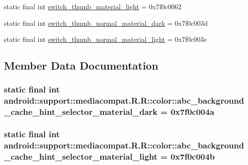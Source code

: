 \begin{CompactItemize}
\item 
static final int \hyperlink{classandroid_1_1support_1_1mediacompat_1_1_r_1_1color_449eb02491887275147f6712844598fb}{switch\_\-thumb\_\-material\_\-light} = 0x7f0c0062
\item 
static final int \hyperlink{classandroid_1_1support_1_1mediacompat_1_1_r_1_1color_df250ab8a51b8f3baa296829ef2e17cd}{switch\_\-thumb\_\-normal\_\-material\_\-dark} = 0x7f0c003d
\item 
static final int \hyperlink{classandroid_1_1support_1_1mediacompat_1_1_r_1_1color_b4ffa81d6154b0a9ac95874a2bc6dd8d}{switch\_\-thumb\_\-normal\_\-material\_\-light} = 0x7f0c003e
\end{CompactItemize}


\subsection{Member Data Documentation}
\hypertarget{classandroid_1_1support_1_1mediacompat_1_1_r_1_1color_10fec5da70dd3f777383920660c7beec}{
\subsubsection[{abc\_\-background\_\-cache\_\-hint\_\-selector\_\-material\_\-dark}]{\setlength{\rightskip}{0pt plus 5cm}static final int android::support::mediacompat.R.R::color::abc\_\-background\_\-cache\_\-hint\_\-selector\_\-material\_\-dark = 0x7f0c004a}}
\label{classandroid_1_1support_1_1mediacompat_1_1_r_1_1color_10fec5da70dd3f777383920660c7beec}


\hypertarget{classandroid_1_1support_1_1mediacompat_1_1_r_1_1color_e82d09f2212cb861d0adba0d5479deac}{
\subsubsection[{abc\_\-background\_\-cache\_\-hint\_\-selector\_\-material\_\-light}]{\setlength{\rightskip}{0pt plus 5cm}static final int android::support::mediacompat.R.R::color::abc\_\-background\_\-cache\_\-hint\_\-selector\_\-material\_\-light = 0x7f0c004b}}
\label{classandroid_1_1support_1_1mediacompat_1_1_r_1_1color_e82d09f2212cb861d0adba0d5479deac}


